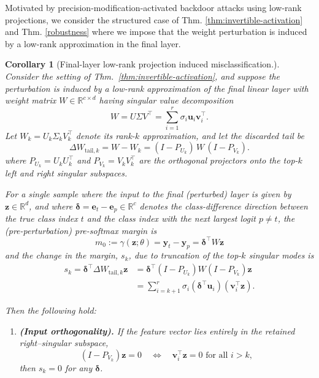 \documentclass{article}
\theoremstyle{plain}
\newtheorem{corollary}[theorem]{Corollary}
\theoremstyle{definition}
\theoremstyle{remark}
\begin{document}
Motivated by precision-modification-activated backdoor attacks using low-rank projections, we consider the structured case of Thm. \ref{thm:invertible-activation} and Thm. \ref{robustness} where we impose that the weight perturbation is induced by a low-rank approximation in the final layer.
\begin{corollary}[Final-layer low-rank projection induced misclassification.]
\label{cor:low-rank-attack}
Consider the setting of Thm.~\ref{thm:invertible-activation}, and suppose the perturbation is induced by a low-rank approximation of the final linear layer with weight matrix
$W \in \mathbb{R}^{c \times d}$ having singular value decomposition
\begin{equation}\nonumber
    W = U \Sigma V^\top = 
\sum_{i=1}^r \sigma_i \mathbf u_i \mathbf v_i^\top.
\end{equation}
Let $W_k = U_k \Sigma_k V_k^\top$ denote its rank-$k$ approximation, 
and let the discarded tail be
\[
\Delta W_{\mathrm{tail},k}
  = W - W_k 
  = (I - P_{U_k})\, W\, (I - P_{V_k}).
\]
where $P_{U_k} = U_k U_k^\top$ and $P_{V_k} = V_k V_k^\top$ are the orthogonal projectors 
onto the top-$k$ left and right singular subspaces.

For a single sample where the input to the final (perturbed) layer is given by $\mathbf z \in \mathbb R^d$,
and where $\boldsymbol{\delta} = \mathbf e_t - \mathbf e_p \in \mathbb R^c$ denotes the class-difference
direction between the true class index $t$ and the class index with the next largest logit $p \neq t$,
the (pre-perturbation) pre-softmax margin is
\[
m_0 := \gamma(\mathbf z;\theta) =\mathbf y_t - \mathbf y_p= \boldsymbol{\delta}^\top W \mathbf z
\]
and the change in the margin, $s_k$, due to truncation of the top-$k$ singular modes is
\begin{align}
   s_k 
  = \boldsymbol{\delta}^\top \Delta W_{\mathrm{tail},k} \mathbf z
  &= \boldsymbol{\delta}^\top (I - P_{U_k}) W (I - P_{V_k})\mathbf z \\
  &= \sum_{i=k+1}^r \sigma_i (\boldsymbol{\delta}^\top \mathbf u_i)(\mathbf v_i^\top\mathbf z). 
\end{align}

Then the following hold:
\begin{enumerate}
  \item \textbf{(Input orthogonality).}
  If the feature vector lies entirely in the retained right–singular subspace,
  \[
  (I - P_{V_k}) \mathbf z = 0 
  \quad \Leftrightarrow \quad
  \mathbf v_i^\top \mathbf z = 0 \text{ for all } i > k,
  \]
  then $s_k = 0$ for any $\boldsymbol{\delta}$.


\end{enumerate}
\end{corollary}
\end{document}
